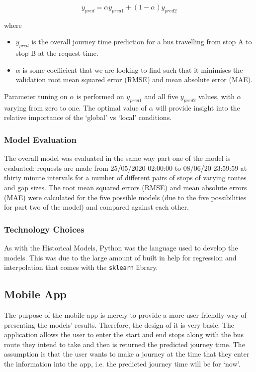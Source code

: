\begin{equation}
\label{eq:regression-overall}
    y_{pred} = \alpha y_{pred1} + (1 - \alpha)y_{pred2}
\end{equation}

where 
\begin{itemize}
    \item $y_{pred}$ is the overall journey time prediction for a bus travelling from stop A to stop B at the request time.
    \item $\alpha$ is some coefficient that we are looking to find such that it minimises the validation root mean squared error (RMSE) and mean absolute error (MAE). 
\end{itemize}

Parameter tuning on $\alpha$ is performed on $y_{pred1}$ and all five $y_{pred2}$ values, with $\alpha$ varying from zero to one. The optimal value of $\alpha$ will provide insight into the relative importance of the `global' vs `local' conditions. 

\subsubsection{Model Evaluation}

The overall model was evaluated in the same way part one of the model is evaluated: requests are made from 25/05/2020 02:00:00 to 08/06/20 23:59:59 at thirty minute intervals for a number of different pairs of stops of varying routes and gap sizes. The root mean squared errors (RMSE) and mean absolute errors (MAE) were calculated for the five possible models (due to the five possibilities for part two of the model) and compared against each other.

\subsubsection{Technology Choices}

As with the Historical Models, Python was the language used to develop the models. This was due to the large amount of built in help for regression and interpolation that comes with the \texttt{sklearn} library. 

\subsection{Mobile App}

The purpose of the mobile app is merely to provide a more user friendly way of presenting the models' results. Therefore, the design of it is very basic. The application allows the user to enter the start and end stops along with the bus route they intend to take and then is returned the predicted journey time. The assumption is that the user wants to make a journey at the time that they enter the information into the app, i.e. the predicted journey time will be for `now'. \\

